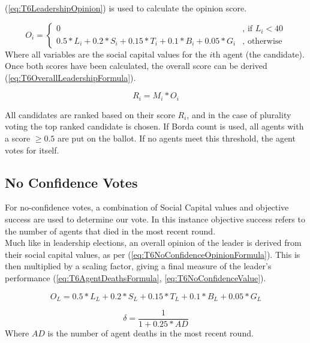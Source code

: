 (\ref{eq:T6LeadershipOpinion}) is used to calculate the opinion score.

\begin{equation}\label{eq:T6LeadershipOpinion}
    O_{i}=\left\{
    	\begin{array}{ll}
    		0 & \mbox{, if } L_{i} < 40 \\
    	  0.5 * L_{i} + 0.2 * S_{i} + 0.15 * T_{i} + 0.1 * B_{i} + 0.05 * G_{i} & \mbox{, otherwise} 
    	\end{array}\right.
\end{equation}
Where all variables are the social capital values for the $i$th agent (the candidate).\\

Once both scores have been calculated, the overall score can be derived (\ref{eq:T6OverallLeadershipFormula}).

\begin{equation}\label{eq:T6OverallLeadershipFormula}
    R_{i} = M_{i} * O_{i}
\end{equation}

All candidates are ranked based on their score $R_{i}$, and in the case of plurality voting the top ranked candidate is chosen. If Borda count is used, all agents with a score $\geq 0.5$ are put on the ballot. If no agents meet this threshold, the agent votes for itself.

\subsection{No Confidence Votes}

For no-confidence votes, a combination of Social Capital values and objective success are used to determine our vote. In this instance objective success refers to the number of agents that died in the most recent round.\\

Much like in leadership elections, an overall opinion of the leader is derived from their social capital values, as per (\ref{eq:T6NoConfidenceOpinionFormula}). This is then multiplied by a scaling factor, giving a final measure of the leader's performance (\ref{eq:T6AgentDeathsFormula}, \ref{eq:T6NoConfidenceValue}).

\begin{equation}\label{eq:T6NoConfidenceOpinionFormula}
    O_{L} = 0.5 * L_{L} + 0.2 * S_{L} + 0.15 * T_{L} + 0.1 * B_{L} + 0.05 * G_{L}
\end{equation}

\begin{equation}\label{eq:T6AgentDeathsFormula}
    \delta = \frac{1}{1+0.25*AD}
\end{equation}
Where $AD$ is the number of agent deaths in the most recent round.

